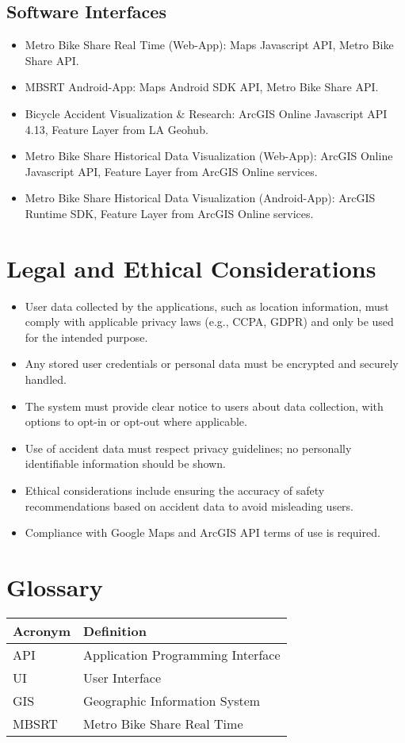 \documentclass[15pt]{article}
\begin{document}

\subsection{Software Interfaces}
\begin{itemize}
    \item Metro Bike Share Real Time (Web-App): Maps Javascript API, Metro Bike Share API.
    \item MBSRT Android-App: Maps Android SDK API, Metro Bike Share API.
    \item Bicycle Accident Visualization \& Research: ArcGIS Online Javascript API 4.13, Feature Layer from LA Geohub.
    \item Metro Bike Share Historical Data Visualization (Web-App): ArcGIS Online Javascript API, Feature Layer from ArcGIS Online services.
    \item Metro Bike Share Historical Data Visualization (Android-App): ArcGIS Runtime SDK, Feature Layer from ArcGIS Online services.
\end{itemize}


\newpage

\section{Legal and Ethical Considerations}
\begin{itemize}
    \item User data collected by the applications, such as location information, must comply with applicable privacy laws (e.g., CCPA, GDPR) and only be used for the intended purpose.
    \item Any stored user credentials or personal data must be encrypted and securely handled.
    \item The system must provide clear notice to users about data collection, with options to opt-in or opt-out where applicable.
    \item Use of accident data must respect privacy guidelines; no personally identifiable information should be shown.
    \item Ethical considerations include ensuring the accuracy of safety recommendations based on accident data to avoid misleading users.
    \item Compliance with Google Maps and ArcGIS API terms of use is required.
\end{itemize}

\newpage

\section*{Glossary}
\begin{longtable}{|l|l|}
\hline
Acronym & Definition \\
\hline
API & Application Programming Interface \\
UI & User Interface \\
GIS & Geographic Information System \\
MBSRT & Metro Bike Share Real Time \\
\hline
\end{longtable}
\end{document}
